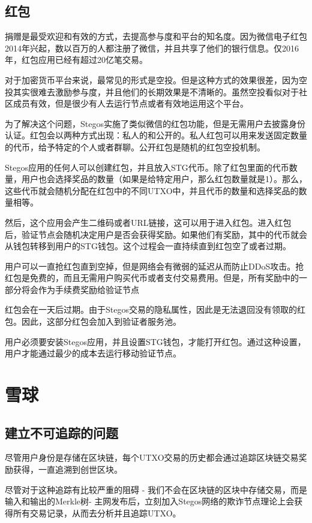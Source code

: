 \documentclass[8pt,fleqn,openany]{book}
\begin{document}
\begin{CJK*}{UTF8}{gbsn}
\subsection{红包}\label{sec:red-packets}
捐赠是最受欢迎和有效的方式，去提高参与度和平台的知名度。因为微信电子红包2014年兴起，数以百万的人都注册了微信，并且共享了他们的银行信息。仅2016年，红包应用已经有超过20亿笔交易。

对于加密货币平台来说，最常见的形式是空投。但是这种方式的效果很差，因为空投其实很难去激励参与度，并且他们的长期效果是不清晰的。虽然空投看似对于社区成员有效，但是很少有人去运行节点或者有效地运用这个平台。

为了解决这个问题，Stegos实施了类似微信的红包功能，但是无需用户去披露身份认证。红包会以两种方式出现：私人的和公开的。私人红包可以用来发送固定数量的代币，给予特定的个人或者群聊。公开红包是随机的红包空投机制。

Stegos应用的任何人可以创建红包，并且放入STG代币。除了红包里面的代币数量，用户也会选择奖品的数量（如果是给特定用户，那么红包数量就是1）。那么，这些代币就会随机分配在红包中的不同UTXO中，并且代币的数量和选择奖品的数量相等。

然后，这个应用会产生二维码或者URL链接，这可以用于进入红包。进入红包后，验证节点会随机决定用户是否会获得奖励。如果他们有奖励，其中的代币就会从钱包转移到用户的STG钱包。这个过程会一直持续直到红包空了或者过期。

用户可以一直抢红包直到空掉，但是网络会有微弱的延迟从而防止DDoS攻击。抢红包是免费的，而且无需用户购买代币或者支付交易费用。但是，所有奖励中的一部分将会作为手续费奖励给验证节点

红包会在一天后过期。由于Stegos交易的隐私属性，因此是无法退回没有领取的红包。因此，这部分红包会加入到验证者服务池。

用户必须要安装Stegos应用，并且设置STG钱包，才能打开红包。通过这种设置，用户才能通过最少的成本去运行移动验证节点。

\section{雪球}
\subsection{建立不可追踪的问题}
尽管用户身份是存储在区块链，每个UTXO交易的历史都会通过追踪区块链交易奖励获得，一直追溯到创世区块。

尽管对于这种追踪有比较严重的阻碍 - 我们不会在区块链的区块中存储交易，而是输入和输出的Merkle树- 主网发布后，立刻加入Stegos网络的欺诈节点理论上会获得所有交易记录，从而去分析并且追踪UTXO。


\end{CJK*}
\end{document}
